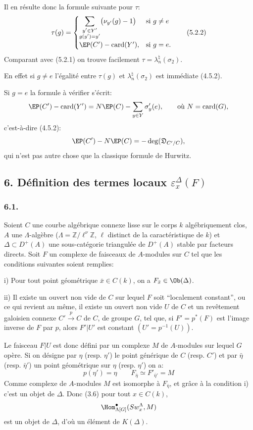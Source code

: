 Il en résulte donc la formule suivante pour $\tau$:
\[
\tau(g)=
\begin{cases}
\displaystyle\sum_{\substack{y'\in Y'\\g(y')=y'}}\bigl(\nu_{y'}(g)-1\bigr)& \text{si } g\ne e\\[0.8em]
\EP(C')-\operatorname{card}(Y'),& \text{si } g=e.
\end{cases}
\tag{5.2.2}
\]
Comparant avec (5.2.1) on trouve facilement $\tau=\lambda_n^\natural(\sigma_2)$.

En effet si $g\ne e$ l'égalité entre $\tau(g)$ et $\lambda_n^\natural(\sigma_2)$ est immédiate (4.5.2).

Si $g=e$ la formule à vérifier s'écrit:
\[
\EP(C')-\operatorname{card}(Y')
=
N\EP(C)-\sum_{y\in Y}\sigma'_y(e),
\qquad\text{où } N=\operatorname{card}(G),
\]
c'est-à-dire (4.5.2):
\[
\EP(C')-N\EP(C)=-\deg(\mathfrak{D}_{C'/C}),
\]
qui n'est pas autre chose que la classique formule de Hurwitz.

\subsection*{6. Définition des termes locaux $\varepsilon_x^\Delta(F)$}

\subsubsection*{6.1.}

Soient $C$ une courbe algébrique connexe lisse sur le corps $k$ algébriquement clos, $A$ une $\Lambda$-algèbre ($\Lambda=\mathbb{Z}/\ell^\nu\mathbb{Z}$, $\ell$ distinct de la caractéristique de $k$) et $\Delta\subset D^+(A)$ une sous-catégorie triangulée de $D^+(A)$ stable par facteurs directs. Soit $F$ un complexe de faisceaux de $A$-modules sur $C$ tel que les conditions suivantes soient remplies:

i) Pour tout point géométrique $\bar x\in C(k)$, on a $F_{\bar x}\in\Ob(\Delta)$.

ii) Il
existe un ouvert non vide de $C$ sur lequel $F$ soit ``localement constant'', ou ce qui revient au même, il existe un ouvert non vide $U$ de $C$ et un revêtement galoisien connexe $C'\xrightarrow{p}C$ de $C$, de groupe $G$, tel que, si $F'=p^*(F)$ est l'image inverse de $F$ par $p$, alors $F'|U'$ est constant $(U'=p^{-1}(U))$.

Le faisceau $F|U$ est donc défini par un complexe $M$ de $A$-modules sur lequel $G$ opère. Si on désigne par $\eta$ (resp. $\eta'$) le point générique de $C$ (resp. $C'$) et par $\bar\eta$ (resp. $\bar\eta'$) un point géométrique sur $\eta$ (resp. $\eta'$) on a:
\[
p(\eta')=\eta\qquad
F_{\bar\eta}\simeq F'_{\bar\eta'}=M
\tag{6.1.1}
\]
Comme complexe de $A$-modules $M$ est isomorphe à $F_{\bar\eta}$, et grâce à la condition i) c'est un objet de $\Delta$. Donc (3.6) pour tout $x\in C(k)$,
\[
\Hom^\bullet_{\Lambda[G]}(Sw_x^\Lambda,M)
\]
est un objet de $\Delta$, d'où un élément de $K(\Delta)$.

